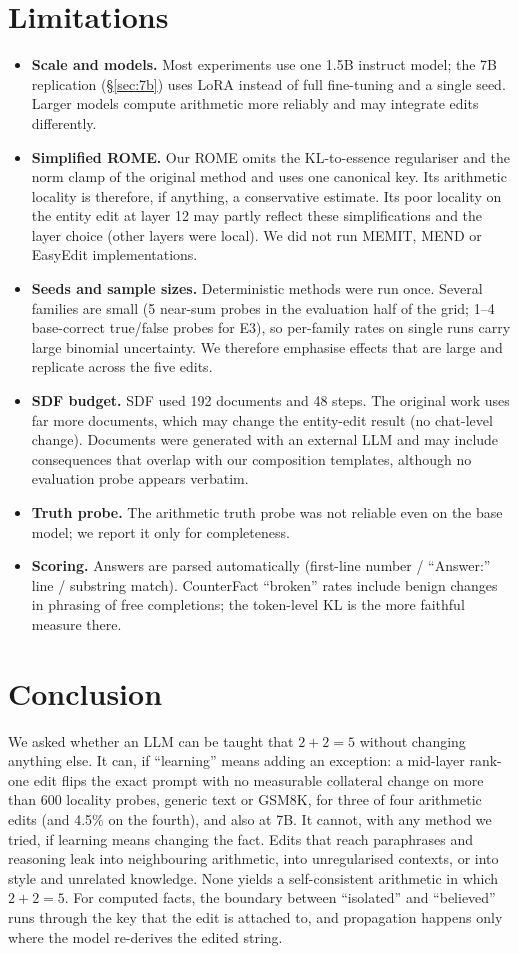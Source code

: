 \section{Limitations}
\label{sec:limits}
\begin{itemize}
\item \textbf{Scale and models.} Most experiments use one 1.5B instruct model; the 7B replication (\S\ref{sec:7b}) uses LoRA instead of full fine-tuning and a single seed. Larger models compute arithmetic more reliably and may integrate edits differently.
\item \textbf{Simplified ROME.} Our ROME omits the KL-to-essence regulariser and the norm clamp of the original method and uses one canonical key. Its arithmetic locality is therefore, if anything, a conservative estimate. Its poor locality on the entity edit at layer 12 may partly reflect these simplifications and the layer choice (other layers were local). We did not run MEMIT, MEND or EasyEdit implementations.
\item \textbf{Seeds and sample sizes.} Deterministic methods were run once. Several families are small (5 near-sum probes in the evaluation half of the grid; 1--4 base-correct true/false probes for E3), so per-family rates on single runs carry large binomial uncertainty. We therefore emphasise effects that are large and replicate across the five edits.
\item \textbf{SDF budget.} SDF used 192 documents and 48 steps. The original work uses far more documents, which may change the entity-edit result (no chat-level change). Documents were generated with an external LLM and may include consequences that overlap with our composition templates, although no evaluation probe appears verbatim.
\item \textbf{Truth probe.} The arithmetic truth probe was not reliable even on the base model; we report it only for completeness.
\item \textbf{Scoring.} Answers are parsed automatically (first-line number / ``Answer:'' line / substring match). CounterFact ``broken'' rates include benign changes in phrasing of free completions; the token-level KL is the more faithful measure there.
\end{itemize}

\section{Conclusion}
We asked whether an LLM can be taught that $2+2=5$ without changing anything else. It can, if ``learning'' means adding an exception: a mid-layer rank-one edit flips the exact prompt with no measurable collateral change on more than 600 locality probes, generic text or GSM8K, for three of four arithmetic edits (and 4.5\% on the fourth), and also at 7B. It cannot, with any method we tried, if learning means changing the fact. Edits that reach paraphrases and reasoning leak into neighbouring arithmetic, into unregularised contexts, or into style and unrelated knowledge. None yields a self-consistent arithmetic in which $2+2=5$. For computed facts, the boundary between ``isolated'' and ``believed'' runs through the key that the edit is attached to, and propagation happens only where the model re-derives the edited string.
